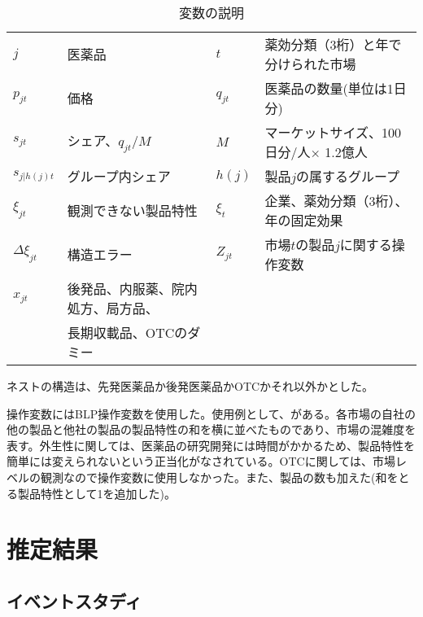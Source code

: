 \documentclass[a4paper,11pt,uplatex]{jsarticle}
\theoremstyle{definition}
\begin{document}
\begin{table}[H]\centering \caption{変数の説明}
    \small
    \begin{tabular}{llll}
        \toprule \label{tab:demand_}
        \(j\) & 医薬品&$t$ &薬効分類（3桁）と年で分けられた市場 \\
        $p_{jt}$ &価格 & $q_{jt}$ &医薬品の数量(単位は1日分)\\ 
        $s_{jt}$ &シェア、$q_{jt}/M$ & $M$ &マーケットサイズ、100日分/人$\times$ 1.2億人\\
        $s_{j|h(j)t}$ & グループ内シェア & $h(j)$ &製品\(j\)の属するグループ\\
        $\xi_{jt}$ & 観測できない製品特性& $\xi_t$ &企業、薬効分類（3桁）、年の固定効果 \\
        $\Delta \xi_{jt}$ & 構造エラー &$Z_{jt}$ &市場\(t\)の製品\(j\)に関する操作変数 \\
        $x_{jt}$ & 後発品、内服薬、院内処方、局方品、& &  \\
         & 長期収載品、OTCのダミー & &\\
         \bottomrule
    \end{tabular}
\end{table}
ネストの構造は、先発医薬品か後発医薬品かOTCかそれ以外かとした。

操作変数にはBLP操作変数を使用した。使用例として、\cite{Iizuka2007}がある。各市場の自社の他の製品と他社の製品の製品特性の和を横に並べたものであり、市場の混雑度を表す。外生性に関しては、医薬品の研究開発には時間がかかるため、製品特性を簡単には変えられないという正当化がなされている。OTCに関しては、市場レベルの観測なので操作変数に使用しなかった。また、製品の数も加えた(和をとる製品特性として1を追加した)。

\section{推定結果} 
\subsection{イベントスタディ}
\end{document}

